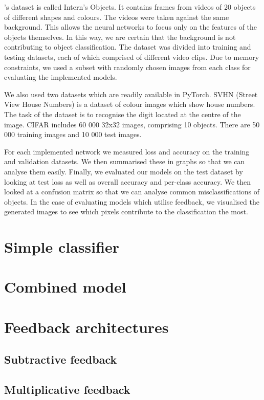 \documentclass{l4proj}
\begin{document}
\cite{Samagaio}'s dataset is called Intern's Objects. It contains frames from videos of 20 objects of different shapes and colours. The videos were taken against the same background. This allows the neural networks to focus only on the features of the objects themselves. In this way, we are certain that the background is not contributing to object classification. The dataset was divided into training and testing datasets, each of which comprised of different video clips. Due to memory constraints, we used a subset with randomly chosen images from each class for evaluating the implemented models.

We also used two datasets which are readily available in PyTorch.
SVHN (Street View House Numbers) is a dataset of colour images which show house numbers. The task of the dataset is to recognise the digit located at the centre of the image.
CIFAR includes 60 000 32x32 images, comprising 10 objects. There are 50 000 training images and 10 000 test images.

For each implemented network we measured loss and accuracy on the training and validation datasets. We then summarised these in graphs so that we can analyse them easily. Finally, we evaluated our models on the test dataset by looking at test loss as well as overall accuracy and per-class accuracy. We then looked at a confusion matrix so that we can analyse common misclassifications of objects. In the case of evaluating models which utilise feedback, we visualised the generated images to see which pixels contribute to the classification the most. 




\section{Simple classifier}
\section{Combined model}
\section{Feedback architectures}
\subsection{Subtractive feedback}
\subsection{Multiplicative feedback}
\end{document}
